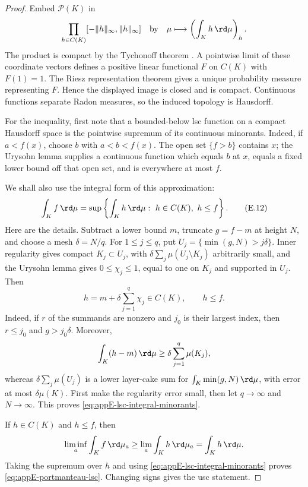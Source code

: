 \begin{proof}
Embed \(\mathcal P(K)\) in
\[
 \prod_{h\in C(K)}[-\lVert h\rVert_\infty,\lVert h\rVert_\infty]
 \quad\text{by}\quad
 \mu\longmapsto\left(\int_Kh\,\rd\mu\right)_h.
\]
The product is compact by the Tychonoff theorem
\cite[Chapter~5]{Kel75}.  A pointwise limit of these coordinate vectors
defines a positive linear functional \(F\) on \(C(K)\) with \(F(1)=1\).
The Riesz representation theorem
\cite[Theorem~2.14]{Rud87} gives a unique probability measure representing
\(F\).  Hence the displayed image is closed and is compact.  Continuous
functions separate Radon measures, so the induced topology is Hausdorff.

For the inequality, first note that a bounded-below lsc function on a
compact Hausdorff space is the pointwise supremum of its continuous
minorants.  Indeed, if \(a<f(x)\), choose \(b\) with \(a<b<f(x)\).
The open set \(\{f>b\}\) contains \(x\); the Urysohn lemma supplies a
continuous function which equals \(b\) at \(x\), equals a fixed lower
bound off that open set, and is everywhere at most \(f\).

We shall also use the integral form of this approximation:
\[
 \int_K f\,\rd\mu
 =\sup\left\{\int_Kh\,\rd\mu:\ h\in C(K),\ h\leq f\right\}.
\tag{E.12}\label{eq:appE-lsc-integral-minorants}
\]
Here are the details.  Subtract a lower bound \(m\), truncate
\(g=f-m\) at height \(N\), and choose a mesh
\(\delta=N/q\).  For \(1\leq j\leq q\), put
\(U_j=\{\min(g,N)>j\delta\}\).  Inner regularity gives compact
\(K_j\subset U_j\), with
\(\delta\sum_j\mu(U_j\setminus K_j)\) arbitrarily small, and the Urysohn
lemma gives \(0\leq\chi_j\leq1\), equal to one on \(K_j\) and supported
in \(U_j\).  Then
\[
 h=m+\delta\sum_{j=1}^{q}\chi_j\in C(K),
 \qquad h\leq f.
\]
Indeed, if \(r\) of the summands are nonzero and \(j_0\) is their largest
index, then \(r\leq j_0\) and \(g>j_0\delta\).  Moreover,
\[
 \int_K(h-m)\,\rd\mu
 \geq\delta\sum_{j=1}^{q}\mu(K_j),
\]
whereas \(\delta\sum_j\mu(U_j)\) is a lower layer-cake sum for
\(\int_K\min(g,N)\,\rd\mu\), with error at most \(\delta\mu(K)\).
First make the regularity error small, then let \(q\to\infty\) and
\(N\to\infty\).  This proves
\eqref{eq:appE-lsc-integral-minorants}.

If \(h\in C(K)\) and \(h\leq f\), then
\[
 \liminf_a\int_K f\,\rd\mu_a
 \geq \lim_a\int_K h\,\rd\mu_a
 =\int_Kh\,\rd\mu.
\]
Taking the supremum over \(h\) and using
\eqref{eq:appE-lsc-integral-minorants} proves
\eqref{eq:appE-portmanteau-lsc}.  Changing signs gives the usc statement.
\end{proof}

